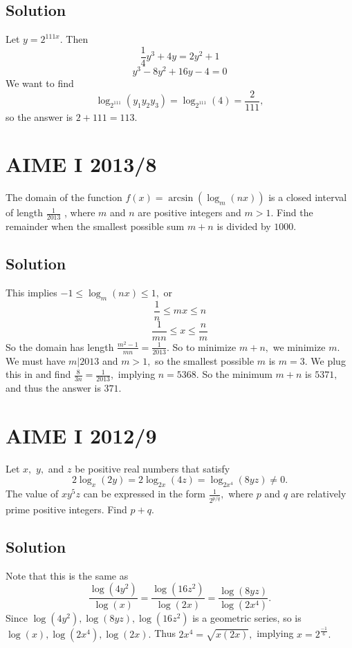 \documentclass[blue,onecol]{shooting}
\begin{document}
\subsection{Solution}

Let $y=2^{111x}.$ Then
    \[\frac{1}{4}y^3+4y=2y^2+1\]
    \[y^3-8y^2+16y-4=0\]
    We want to find
    \[\log_{2^{111}}({y_1y_2y_3})=\log_{2^{111}}({4})=\frac{2}{111},\]
    so the answer is $2+111=113.$

\section{AIME I 2013/8}

The domain of the function $f(x) = \arcsin(\log_{m}(nx))$ is a closed interval of length $\frac{1}{2013}$ , where $m$ and $n$ are positive integers and $m>1$. Find the remainder when the smallest possible sum $m+n$ is divided by $1000.$

\subsection{Solution}

This implies $-1\leq \log_m(nx)\leq 1,$ or
    \[\frac{1}{n}\leq mx\leq n\]
    \[\frac{1}{mn}\leq x\leq \frac{n}{m}\]
    So the domain has length $\frac{m^2-1}{mn}=\frac{1}{2013}.$ So to minimize $m+n,$ we minimize $m.$ We must have $m|2013$ and $m>1,$ so the smallest possible $m$ is $m=3.$ We plug this in and find $\frac{8}{3n}=\frac{1}{2013},$ implying $n=5368.$ So the minimum $m+n$ is $5371,$ and thus the answer is $371.$

\section{AIME I 2012/9}

Let $x,$ $y,$ and $z$ be positive real numbers that satisfy \[2\log_{x}(2y) = 2\log_{2x}(4z) = \log_{2x^4}(8yz) \ne 0.\] The value of $xy^5z$ can be expressed in the form $\frac{1}{2^{p/q}},$ where $p$ and $q$ are relatively prime positive integers. Find $p+q.$

\subsection{Solution}

Note that this is the same as
    \[\frac{\log(4y^2)}{\log(x)}=\frac{\log(16z^2)}{\log(2x)}=\frac{\log(8yz)}{\log(2x^4)}.\]
    Since $\log(4y^2),\log(8yz),\log(16z^2)$ is a geometric series, so is $\log(x),\log(2x^4),\log(2x).$ Thus $2x^4=\sqrt{x(2x)},$ implying $x=2^{\frac{-1}{6}}.$
    
\end{document}
